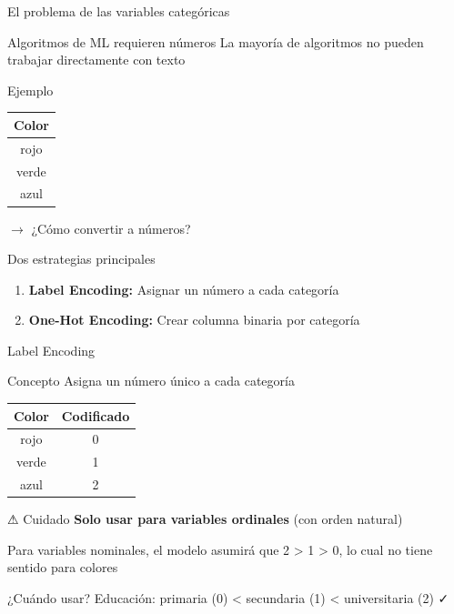 \documentclass[aspectratio=169]{beamer}
\begin{document}
\begin{frame}{El problema de las variables categóricas}
\begin{alertblock}{Algoritmos de ML requieren números}
La mayoría de algoritmos no pueden trabajar directamente con texto
\end{alertblock}

\begin{exampleblock}{Ejemplo}
\begin{center}
\begin{tabular}{|c|}
\hline
\textbf{Color} \\
\hline
rojo \\
verde \\
azul \\
\hline
\end{tabular}
\quad $\rightarrow$ \quad ¿Cómo convertir a números?
\end{center}
\end{exampleblock}

\pause

\begin{block}{Dos estrategias principales}
\begin{enumerate}
    \item \textbf{Label Encoding:} Asignar un número a cada categoría
    \item \textbf{One-Hot Encoding:} Crear columna binaria por categoría
\end{enumerate}
\end{block}
\end{frame}

\begin{frame}{Label Encoding}
\begin{block}{Concepto}
Asigna un número único a cada categoría

\begin{center}
\begin{tabular}{|c|c|}
\hline
\textbf{Color} & \textbf{Codificado} \\
\hline
rojo & 0 \\
verde & 1 \\
azul & 2 \\
\hline
\end{tabular}
\end{center}
\end{block}

\pause

\begin{alertblock}{⚠ Cuidado}
\textbf{Solo usar para variables ordinales} (con orden natural)

Para variables nominales, el modelo asumirá que 2 > 1 > 0, lo cual no tiene sentido para colores
\end{alertblock}

\begin{block}{¿Cuándo usar?}
Educación: primaria (0) < secundaria (1) < universitaria (2) ✓
\end{block}
\end{frame}
\end{document}

